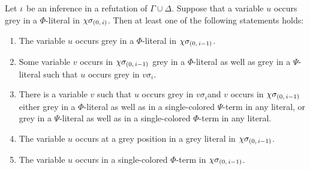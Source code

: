 \documentclass[,%
	draft=false,%
	numbers=noendperiod
	12pt,
	a4paper,
	oneside,%
	openany,
]{memoir}
\newcommand{\inv}{\ensuremath{\chi}}
\begin{document}
\begin{lemma}
	\label{lemma:var_grey_col_lit}
	Let $\iota$ be an inference in a refutation of $\Gamma\cup\Delta$.
	Suppose that a variable $u$ occurs grey in a $\Phi$-literal in $\inv\sigmazi$.
	Then at least one of the following statements holds:
	\begin{enumerate}
		\item
			\label{14_1}
			The variable $u$ occurs grey in a $\Phi$-literal in $\inv\sigmazmi$.

		\item 
			\label{14_2}
			Some variable $v$ occurs in $\inv\sigmazmi$ grey in a $\Phi$-literal as well as grey in a $\Psi$-literal such that $u$ occurs grey in $v\sigma_i$.

		\item 
			\label{14_3}
			There is a variable $v$ such that $u$ occurs grey in $v\sigma_i$\footnotemark and $v$ occurs in $\inv\sigmazmi$
			either grey in a $\Phi$-literal as well as in a single-colored $\Psi$-term in any literal, 
			or grey in a $\Psi$-literal as well as in a single-colored $\Phi$-term in any literal.

		\item
			\label{14_4}
			The variable $u$ occurs at a grey position in a grey literal in $\inv\sigmazmi$.

		\item
			\label{14_5}
			The variable $u$ occurs in a single-colored $\Phi$-term in $\inv\sigmazmi$.

	\end{enumerate}
\end{lemma}
\end{document}
